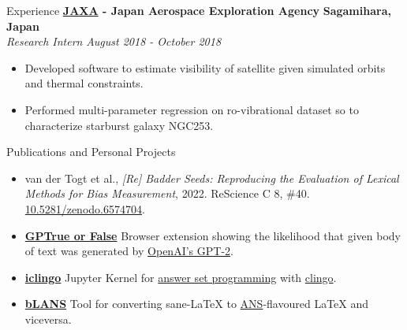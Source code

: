 \documentclass{resume} %
\begin{document}
\begin{rSection}{Experience}
	{\bf \href{https://global.jaxa.jp/}{JAXA} -  Japan Aerospace Exploration Agency} \hfill \textbf{Sagamihara, Japan}
	\\ \textit{Research Intern} \hfill {\em August 2018 - October 2018}
	\begin{itemize}\vspace{-0.5em}
		\item Developed software to estimate visibility of satellite given simulated orbits and thermal
		      constraints.
		\item Performed multi-parameter regression on ro-vibrational dataset so to characterize
		      starburst galaxy NGC253.
	\end{itemize}
\end{rSection}

\begin{rSection}{Publications and Personal Projects}

	\begin{itemize}
	\item van der Togt et al., \textit{[Re] Badder Seeds: Reproducing the Evaluation of Lexical
		Methods for Bias Measurement}, 2022. ReScience C 8,
		      \#40. \href{https://doi.org/10.5281/zenodo.6574704}{10.5281/zenodo.6574704}.
		\item
		      {\bf \href{https://www.giuliostarace.com/projects/gptrue-or-false/}{GPTrue or False}}
		      Browser extension showing the likelihood that given body of text was generated by
		      \href{https://openai.com/blog/better-language-models/}{OpenAI's GPT-2}.
		\item
		      {\bf \href{https://github.com/thesofakillers/iclingo}{iclingo}}
		      Jupyter Kernel for \href{https://en.wikipedia.org/wiki/Answer_set_programming}{answer set
			      programming}  with \href{https://potassco.org/clingo/}{clingo}.
		\item
		      {\bf \href{https://github.com/thesofakillers/bLANS}{bLANS}} Tool for converting sane-LaTeX
		      to \href{https://ans.app/}{ANS}-flavoured LaTeX and viceversa.
	\end{itemize}
\end{rSection}
\end{document}
